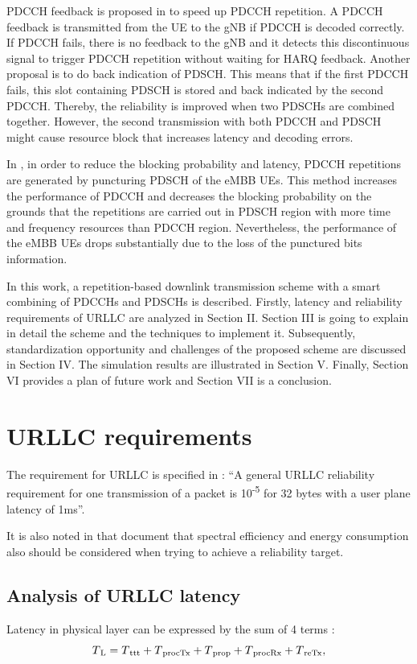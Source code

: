 \documentclass[conference]{IEEEtran}
\begin{document}
PDCCH feedback is proposed in \cite{b4} to speed up PDCCH repetition. A PDCCH feedback is transmitted from the UE to the gNB if PDCCH is decoded correctly. If PDCCH fails, there is no feedback to the gNB and it detects this discontinuous signal to trigger PDCCH repetition without waiting for HARQ feedback. Another proposal is to do back indication of PDSCH. This means that if the first PDCCH fails, this slot containing PDSCH is stored and back indicated by the second PDCCH. Thereby, the reliability is improved when two PDSCHs are combined together. However, the second transmission with both PDCCH and PDSCH might cause resource block that increases latency and decoding errors.

In \cite{b5}, in order to reduce the blocking probability and latency, PDCCH repetitions are generated by puncturing PDSCH of the eMBB UEs. This method increases the performance of PDCCH and decreases the blocking probability on the grounds that the repetitions are carried out in PDSCH region with more time and frequency resources than PDCCH region. Nevertheless, the performance of the eMBB UEs drops substantially due to the loss of the punctured bits\textquotesingle \, information.

In this work, a repetition-based downlink transmission scheme with a smart combining of PDCCHs and PDSCHs is described. Firstly, latency and reliability requirements of URLLC are analyzed in Section II. Section III is going to explain in detail the scheme and the techniques to implement it. Subsequently, standardization opportunity and challenges of the proposed scheme are discussed in Section IV. The simulation results are illustrated in Section V. Finally, Section VI provides a plan of future work and Section VII is a conclusion.

\section{URLLC requirements}
The requirement for URLLC is specified in \cite{b6}: ``A general URLLC reliability requirement for one transmission of a packet is 10\textsuperscript{-5} for 32 bytes with a user plane latency of 1ms''.

It is also noted in that document that spectral efficiency and energy consumption also should be considered when trying to achieve a reliability target. 
\subsection{Analysis of URLLC latency}
Latency in physical layer can be expressed by the sum of 4 terms \cite{ad1}:
\begin{equation}
T\textsubscript{L}= T\textsubscript{ttt} + T\textsubscript{procTx} + T\textsubscript{prop} + T\textsubscript{procRx} + T\textsubscript{reTx},\label{eq1}
\end{equation}
\end{document}
